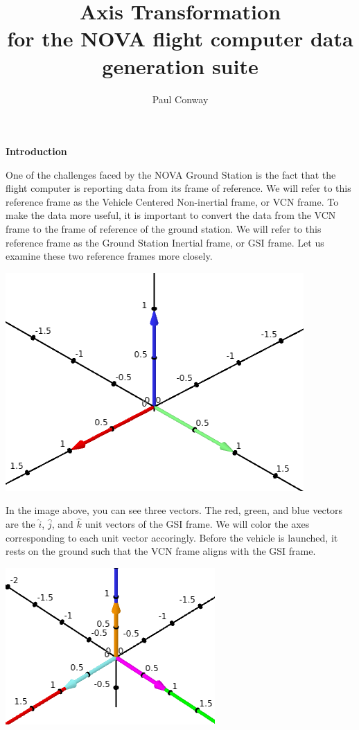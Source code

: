\documentclass[12pt, letterpaper]{article}
\title{Axis Transformation\\ \large for the NOVA flight computer data generation suite}
\author{Paul Conway}
\begin{document}
\maketitle
\pagebreak

\begin{center}
\textbf{Introduction}
\end{center}
One of the challenges faced by the NOVA Ground Station is the fact that the flight computer is reporting data from its frame of reference. We will refer to this reference frame as the Vehicle Centered Non-inertial frame, or VCN frame. To make the data more useful, it is important to convert the data from the VCN frame to the frame of reference of the ground station. We will refer to this reference frame as the Ground Station Inertial frame, or GSI frame. Let us examine these two reference frames more closely.
\begin{center}
\includegraphics[scale=0.65]{GSI_frame_solo}
\end{center}
In the image above, you can see three vectors. The red, green, and blue vectors are the $\hat{i}$, $\hat{j}$, and $\hat{k}$ unit vectors of the GSI frame. We will color the axes corresponding to each unit vector accoringly. Before the vehicle is launched, it rests on the ground such that the VCN frame aligns with the GSI frame.
\begin{center}
\includegraphics[scale=0.65]{GSI_VCN_aligned}
\end{center}
\end{document}
